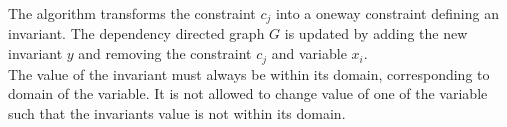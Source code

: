 The algorithm transforms the constraint $c_j$ into a oneway constraint defining an invariant. The dependency directed 
graph $G$ is updated by adding the new invariant $y$ and removing the constraint $c_j$ and variable $x_i$. \medskip 
\\
The value of the invariant must always be within its domain, corresponding to domain of the variable. It is not allowed 
to change value of one of the variable such that the invariants value is not within its domain.





